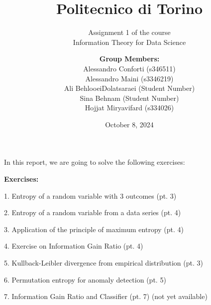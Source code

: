 \documentclass{beamer}
\title{Politecnico di Torino}
\subtitle{\vspace{10pt} Assignment 1 of the course \\ Information Theory for Data Science \vspace{6pt}}
\author{
    {\LARGE \textbf{Group Members:}} \\[8pt]  %
    {\normalsize Alessandro Conforti (s346511)} \\[6pt]    %
    {\normalsize Alessandro Maini (s3346219)} \\[6pt]
    {\normalsize Ali BehlooeiDolatsaraei (Student Number)} \\[6pt]
    {\normalsize Sina Behnam (Student Number)} \\[6pt]
    {\normalsize Hojjat Miryavifard (s334026)}
}
\date{October 8, 2024}
\begin{document}
\maketitle

\begin{frame}

In this report, we are going to solve the following exercises:

\textbf{Exercises:}

1. Entropy of a random variable with 3 outcomes (pt. 3)

2. Entropy of a random variable from a data series (pt. 4)

3. Application of the principle of maximum entropy (pt. 4)

4. Exercise on Information Gain Ratio (pt. 4)

5. Kullback-Leibler divergence from empirical distribution (pt. 3)

6. Permutation entropy for anomaly detection (pt. 5)

7. Information Gain Ratio and Classifier (pt. 7) (not yet available)

\end{frame}

















\backmatter
\end{document}
